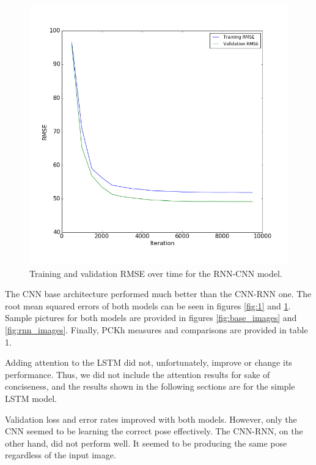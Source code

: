 \documentclass[11pt,twocolumn,letterpaper]{article}
\begin{document}
\begin{figure}[!ht]
\begin{center}
\includegraphics[scale=0.35]{images/rnn_loss}
\end{center}
\caption{Training and validation RMSE over time for the RNN-CNN model.}
\label{fig:2}
\end{figure}

The CNN base architecture performed much better than the CNN-RNN one. 
The root mean squared errors of both models can be seen in figures \ref{fig:1} and \ref{fig:2}.
Sample pictures for both models are provided in figures \ref{fig:base_images} and \ref{fig:rnn_images}. Finally, PCKh measures and comparisons are provided in table 1. 

Adding attention to the LSTM did not, unfortunately, improve or change its performance.
Thus, we did not include the attention results for sake of conciseness, and the results
shown in the following sections are for the simple LSTM model.

Validation loss and error rates improved with both models. However, only the CNN seemed
to be learning the correct pose effectively. The CNN-RNN, on the other hand, did not 
perform well. It seemed to be producing the same pose regardless of the input image.
\end{document}
